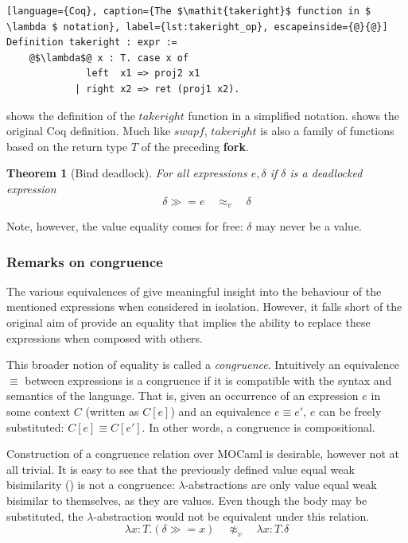 \documentclass[12pt,twoside,notitlepage]{report}
\theoremstyle{plain}%
\newtheorem{thm}{Theorem}[section]
\theoremstyle{definition}
\theoremstyle{remark}
\begin{document}
\begin{lstlisting}[language={Coq}, caption={The $\mathit{takeright}$ function in $ \lambda $ notation}, label={lst:takeright_op}, escapeinside={@}{@}]
Definition takeright : expr :=
    @$\lambda$@ x : T. case x of
              left  x1 => proj2 x1
            | right x2 => ret (proj1 x2).
\end{lstlisting}

 shows the definition of the $ \mathit{takeright} $ function in a simplified notation.  shows the original Coq definition. Much like $\mathit{swapf}$, $\mathit{takeright}$ is also a family of functions based on the return type $ T $ of the preceding \textbf{fork}.

\begin{thm}[Bind deadlock]
For all expressions $ e, \delta$ if $ \delta $ is a deadlocked expression
\[  \delta \gg= e\quad \approx_v \quad \delta \]
\end{thm}

Note, however, the value equality comes for free: $ \delta $ may never be a value.

\subsubsection{Remarks on congruence}

The various equivalences of  give meaningful insight into the behaviour of the mentioned expressions when considered in isolation. However, it falls short of the original aim of provide an equality that implies the ability to replace these expressions when composed with others. 

This broader notion of equality is called a \textit{congruence}. Intuitively an equivalence $ \equiv $ between expressions is a congruence if it is compatible with the syntax and semantics of the language. That is, given an occurrence of an expression $ e $ in some context $ C $ (written as $ C[e] $) and an equivalence $ e \equiv e' $, $ e $ can be freely substituted: $ C[e]\equiv C[e'] $. In other words, a congruence is compositional.

Construction of a congruence relation over MOCaml is desirable, however not at all trivial. It is easy to see that the previously defined value equal weak bisimilarity () is not a congruence: $ \lambda $-abstractions are only  value equal weak bisimilar to themselves, as they are values. Even though the body may be substituted, the $ \lambda $-abstraction would not be equivalent under this relation.
\[ \lambda x : T.( \delta \gg= x)\quad \not\approx_v \quad \lambda x : T.\delta \]
\end{document}
